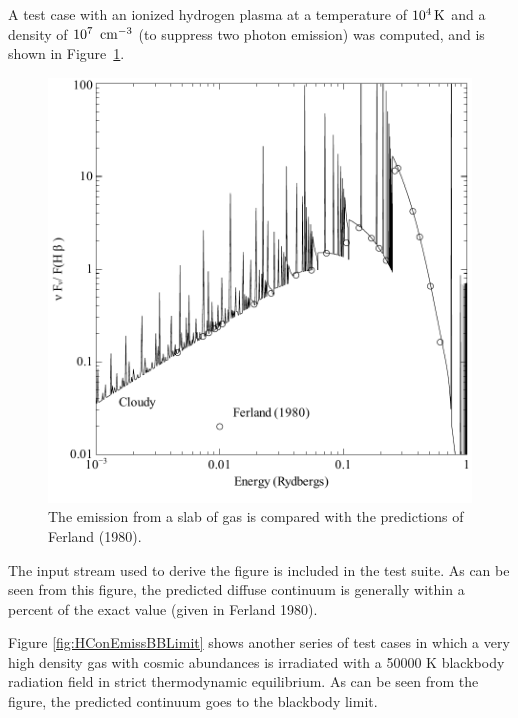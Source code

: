 A test case with an ionized hydrogen plasma at a temperature
of $10^4 {\rm\thinspace K}$ and
a density of $10^7~{\rm\thinspace cm^{-3}}$
(to suppress two photon emission) was computed, and
is shown in Figure~\ref{fig:HemisCompareFerland80}.

\begin{figure}
\centering
\label{fig:HemisCompareFerland80}
\includegraphics[scale=0.8]{HemisCompareFerland80}
\caption[H emission comparision]{The emission from a slab of gas is compared with the
predictions of Ferland (1980).}%
\end{figure}

The input stream used to derive the figure is included in the test suite.
As can be seen from this figure, the predicted diffuse continuum is generally
within a percent of the exact value (given in Ferland 1980).

Figure \ref{fig:HConEmissBBLimit} shows another series of test cases in which a very high density
gas with cosmic abundances is irradiated with a 50000 K blackbody radiation
field in strict thermodynamic equilibrium.  As can be seen from the figure,
the predicted continuum goes to the blackbody limit.

